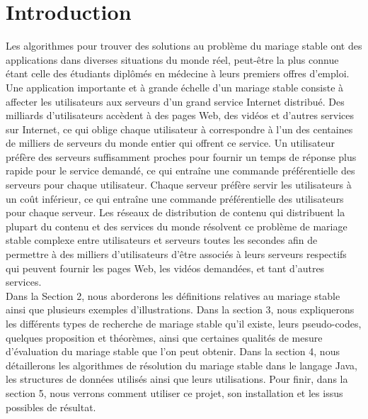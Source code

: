 \documentclass[11pt]{article}
\begin{document}
\maketitle

\tableofcontents

\newpage
\section{Introduction}
Les algorithmes pour trouver des solutions au problème du mariage stable ont des applications dans diverses situations du monde réel, peut-être la plus connue étant celle des étudiants diplômés en médecine à leurs premiers offres d'emploi. Une application importante et à grande échelle d'un mariage stable consiste à affecter les utilisateurs aux serveurs d'un grand service Internet distribué. Des milliards d'utilisateurs accèdent à des pages Web, des vidéos et d'autres services sur Internet, ce qui oblige chaque utilisateur à correspondre à l'un des centaines de milliers de serveurs du monde entier qui offrent ce service. Un utilisateur préfère des serveurs suffisamment proches pour fournir un temps de réponse plus rapide pour le service demandé, ce qui entraîne une commande préférentielle des serveurs pour chaque utilisateur. Chaque serveur préfère servir les utilisateurs à un coût inférieur, ce qui entraîne une commande préférentielle des utilisateurs pour chaque serveur. Les réseaux de distribution de contenu qui distribuent la plupart du contenu et des services du monde résolvent ce problème de mariage stable complexe entre utilisateurs et serveurs toutes les secondes afin de permettre à des milliers d'utilisateurs d'être associés à leurs serveurs respectifs qui peuvent fournir les pages Web, les vidéos demandées, et tant d'autres services.
\\Dans la Section 2, nous aborderons les définitions relatives au mariage stable ainsi que plusieurs exemples d'illustrations. Dans la section 3, nous expliquerons les différents types de recherche de  mariage stable qu'il existe, leurs pseudo-codes, quelques proposition et théorèmes, ainsi que certaines qualités de mesure d'évaluation du mariage stable que l'on peut obtenir. Dans la section 4, nous détaillerons les algorithmes de résolution du  mariage stable dans le langage Java, les structures de données utilisés ainsi que leurs utilisations. Pour finir, dans la section 5, nous verrons comment utiliser ce projet, son installation et les issus possibles de résultat.
\end{document}
